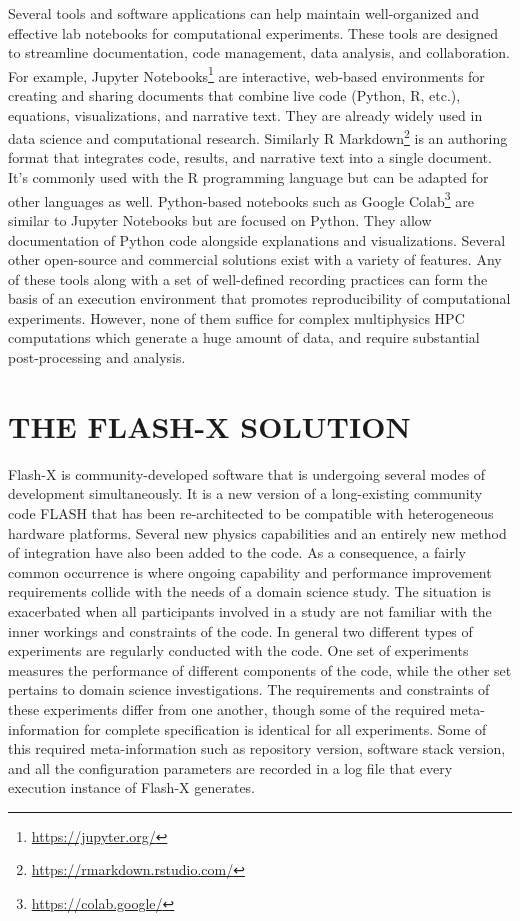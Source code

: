\documentclass{IEEEcsmag}
\begin{document}
Several tools and software applications can help maintain
well-organized and effective lab notebooks for computational
experiments. These tools are designed to streamline documentation,
code management, data analysis, and collaboration.  For example,
Jupyter Notebooks\footnote{\url{https://jupyter.org/}}  are interactive, web-based environments for creating
and sharing documents that combine live code (Python, R, etc.),
equations, visualizations, and narrative text. They are already widely used in
data science and computational research. Similarly R Markdown\footnote{\url{https://rmarkdown.rstudio.com/}} is an authoring
format that integrates code, results, and narrative text into a single
document. It's commonly used with the R programming language but can
be adapted for other languages as well. 
Python-based notebooks such as Google Colab\footnote{\url{https://colab.google/}} are similar to Jupyter Notebooks but are focused on Python. They allow documentation of Python code alongside explanations and visualizations.
Several other open-source and commercial solutions exist with a variety of features. Any of these tools along with a set of well-defined recording practices can form the basis of an execution environment that promotes reproducibility of computational experiments. However, none of them suffice for complex multiphysics HPC computations which generate a huge amount of data, and require substantial post-processing and analysis.

\section {THE FLASH-X SOLUTION} \label{sc:tooling}
Flash-X is community-developed software that is undergoing several modes of development simultaneously. It is a new version of a long-existing community code FLASH \cite{DUBEY2009} that has been re-architected to be compatible with heterogeneous hardware platforms. Several new physics capabilities and an entirely new method of integration have also been added to the code.  As a consequence, a fairly common occurrence is where ongoing capability and performance improvement requirements collide with the needs of a domain science study. The situation is exacerbated when all participants involved in a study are not familiar with the inner workings and constraints of the code. In general two different types of experiments are regularly conducted with the code. One set of experiments measures the performance of different components of the code, while the other set pertains to domain science investigations. The requirements and constraints of these experiments differ from one another, though some of the required meta-information for complete specification is identical for all experiments. Some of this required meta-information such as repository version, software stack version, and all the configuration parameters are recorded in a log file that every execution instance of Flash-X generates.
\end{document}

